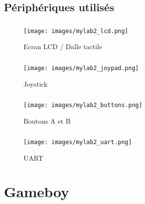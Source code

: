 \documentclass{beamer}
\begin{document}

\subsection{Périphériques utilisés}
\begin{frame}
	\frametitle{\secname}
  \framesubtitle{\subsecname}
  \begin{center}
    \begin{figure}
      \texttt{[image: images/mylab2\_lcd.png]}
      \caption{Ecran LCD / Dalle tactile}
    \end{figure}
  \end{center}
\end{frame}
\begin{frame}
	\frametitle{\secname}
  \framesubtitle{\subsecname}
  \begin{center}
    \begin{figure}
      \texttt{[image: images/mylab2\_joypad.png]}
      \caption{Joystick}
    \end{figure}
  \end{center}
\end{frame}
\begin{frame}
	\frametitle{\secname}
  \framesubtitle{\subsecname}
  \begin{center}
    \begin{figure}
      \texttt{[image: images/mylab2\_buttons.png]}
      \caption{Boutons A et B}
    \end{figure}
  \end{center}
\end{frame}
\begin{frame}
	\frametitle{\secname}
  \framesubtitle{\subsecname}
  \begin{center}
    \begin{figure}
      \texttt{[image: images/mylab2\_uart.png]}
      \caption{UART}
    \end{figure}
  \end{center}
\end{frame}


\section{Gameboy}
\end{document}
